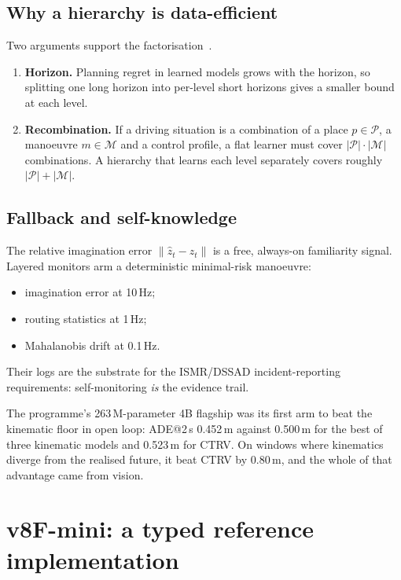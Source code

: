 \documentclass[10pt,twocolumn]{article}
\theoremstyle{remark}
\begin{document}
\subsection{Why a hierarchy is data-efficient}
Two arguments support the factorisation~\cite{hplwm,ssshashua}.
\begin{enumerate}[label=(\roman*)]
  \item \textbf{Horizon.} Planning regret in learned models grows with the horizon, so splitting one long horizon into per-level short
        horizons gives a smaller bound at each level.
  \item \textbf{Recombination.} If a driving situation is a combination of a place $p\in\mathcal P$, a manoeuvre $m\in\mathcal M$ and a
        control profile, a flat learner must cover $|\mathcal P|\cdot|\mathcal M|$ combinations. A hierarchy that learns each level
        separately covers roughly $|\mathcal P|+|\mathcal M|$.
\end{enumerate}

\subsection{Fallback and self-knowledge}
The relative imagination error $\|\hat z_t-z_t\|$ is a free, always-on familiarity signal. Layered monitors arm a deterministic
minimal-risk manoeuvre:
\begin{itemize}
  \item imagination error at 10\,Hz;
  \item routing statistics at 1\,Hz;
  \item Mahalanobis drift at 0.1\,Hz.
\end{itemize}
Their logs are the substrate for the ISMR/DSSAD incident-reporting requirements: self-monitoring \emph{is} the evidence trail.

The programme's 263\,M-parameter 4B flagship was its first arm to beat the kinematic floor in open loop: ADE@2\,s 0.452\,m against
0.500\,m for the best of three kinematic models and 0.523\,m for CTRV. On windows where kinematics diverge from the realised future, it
beat CTRV by 0.80\,m, and the whole of that advantage came from vision.

\section{v8F-mini: a typed reference implementation}\label{sec:v8f}
\end{document}
